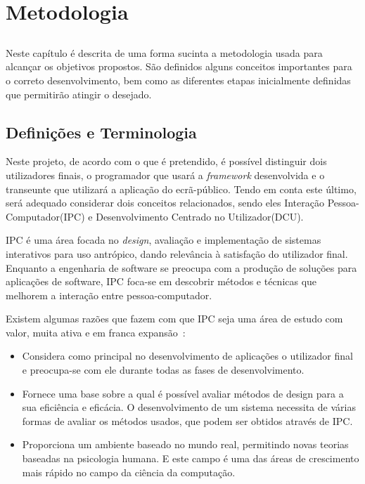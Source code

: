 \chapter{Metodologia} \label{chap:metod}

\section*{}

Neste capítulo é descrita de uma forma sucinta a metodologia usada para alcançar os objetivos propostos. São definidos alguns conceitos importantes para o correto desenvolvimento, bem como as diferentes etapas inicialmente definidas que permitirão atingir o desejado.

\section{Definições e Terminologia}

Neste projeto, de acordo com o que é pretendido, é possível distinguir dois utilizadores finais, o programador que usará a \textit{framework} desenvolvida e o transeunte que utilizará a aplicação do ecrã-público. Tendo em conta este último, será adequado considerar dois conceitos relacionados, sendo eles Interação Pessoa-Computador(IPC) e Desenvolvimento Centrado no Utilizador(DCU).

IPC é uma área focada no \textit{design}, avaliação e implementação de sistemas interativos para uso antrópico, dando relevância à satisfação do utilizador final. 
Enquanto a engenharia de software se preocupa com a produção de soluções para aplicações de software, IPC foca-se em descobrir métodos e técnicas que melhorem a interação entre pessoa-computador.


Existem algumas razões que fazem com que IPC seja uma área de estudo com valor, muita ativa e em franca expansão~\cite{smith2006human}:
\begin{itemize}
	\item Considera como principal no desenvolvimento de aplicações o utilizador final e preocupa-se com ele durante todas as fases de desenvolvimento.
	\item Fornece uma base sobre a qual é possível avaliar métodos de design para a sua eficiência e eficácia. O desenvolvimento de um sistema necessita de várias formas de avaliar os métodos usados, que podem ser obtidos através de IPC.
	\item Proporciona um ambiente baseado no mundo real, permitindo novas teorias baseadas na psicologia humana. E este campo é uma das áreas de crescimento mais rápido no campo da ciência da computação.
\end{itemize}

